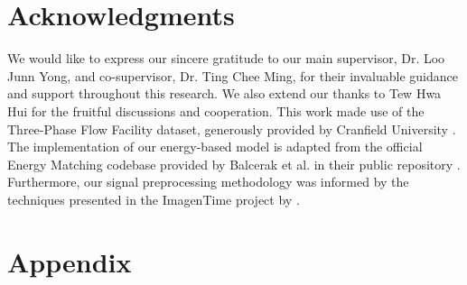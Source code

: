 \documentclass{article}
\begin{document}
\section*{Acknowledgments}
We would like to express our sincere gratitude to our main supervisor, Dr. Loo Junn Yong, and co-supervisor, Dr. Ting Chee Ming, for their invaluable guidance and support throughout this research. We also extend our thanks to Tew Hwa Hui for the fruitful discussions and cooperation.
This work made use of the Three-Phase Flow Facility dataset, generously provided by Cranfield University \citep{cao_mba_lao_samuel_2015}. The implementation of our energy-based model is adapted from the official Energy Matching codebase provided by Balcerak et al. in their public repository \citep{balcerak2025energymatchingunifyingflow}. Furthermore, our signal preprocessing methodology was informed by the techniques presented in the ImagenTime project by \cite{naiman_berman_pemper_arbiv_fadlon_azencot_2024}. 




\section*{Appendix}

\end{document}
